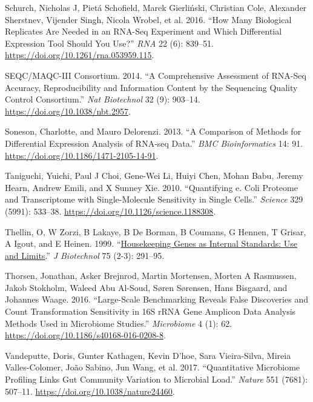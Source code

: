 \documentclass[
]{article}
\newlength{\cslhangindent}
\newlength{\cslentryspacingunit} %
\newenvironment{CSLReferences}[2] %
 {%
  \setlength{\parindent}{0pt}
  \ifodd #1
  \let\oldpar\par
  \def\par{\hangindent=\cslhangindent\oldpar}
  \fi
  \setlength{\parskip}{#2\cslentryspacingunit}
 }%
 {}
\begin{document}
\begin{CSLReferences}{1}{0}
\leavevmode{}%
Schurch, Nicholas J, Pietá Schofield, Marek Gierliński, Christian Cole,
Alexander Sherstnev, Vijender Singh, Nicola Wrobel, et al. 2016. {``How
Many Biological Replicates Are Needed in an RNA-Seq Experiment and Which
Differential Expression Tool Should You Use?''} \emph{RNA} 22 (6):
839--51. \url{https://doi.org/10.1261/rna.053959.115}.

\leavevmode{}%
SEQC/MAQC-III Consortium. 2014. {``A Comprehensive Assessment of RNA-Seq
Accuracy, Reproducibility and Information Content by the Sequencing
Quality Control Consortium.''} \emph{Nat Biotechnol} 32 (9): 903--14.
\url{https://doi.org/10.1038/nbt.2957}.

\leavevmode{}%
Soneson, Charlotte, and Mauro Delorenzi. 2013. {``A Comparison of
Methods for Differential Expression Analysis of {RNA-seq} Data.''}
\emph{BMC Bioinformatics} 14: 91.
\url{https://doi.org/10.1186/1471-2105-14-91}.

\leavevmode{}%
Taniguchi, Yuichi, Paul J Choi, Gene-Wei Li, Huiyi Chen, Mohan Babu,
Jeremy Hearn, Andrew Emili, and X Sunney Xie. 2010. {``Quantifying e.
Coli Proteome and Transcriptome with Single-Molecule Sensitivity in
Single Cells.''} \emph{Science} 329 (5991): 533--38.
\url{https://doi.org/10.1126/science.1188308}.

\leavevmode{}%
Thellin, O, W Zorzi, B Lakaye, B De Borman, B Coumans, G Hennen, T
Grisar, A Igout, and E Heinen. 1999.
{``\href{https://www.ncbi.nlm.nih.gov/pubmed/10617337}{Housekeeping
Genes as Internal Standards: Use and Limits}.''} \emph{J Biotechnol} 75
(2-3): 291--95.

\leavevmode{}%
Thorsen, Jonathan, Asker Brejnrod, Martin Mortensen, Morten A Rasmussen,
Jakob Stokholm, Waleed Abu Al-Soud, Søren Sørensen, Hans Bisgaard, and
Johannes Waage. 2016. {``Large-Scale Benchmarking Reveals False
Discoveries and Count Transformation Sensitivity in 16{S} r{RNA} Gene
Amplicon Data Analysis Methods Used in Microbiome Studies.''}
\emph{Microbiome} 4 (1): 62.
\url{https://doi.org/10.1186/s40168-016-0208-8}.

\leavevmode{}%
Vandeputte, Doris, Gunter Kathagen, Kevin D'hoe, Sara Vieira-Silva,
Mireia Valles-Colomer, João Sabino, Jun Wang, et al. 2017.
{``Quantitative Microbiome Profiling Links Gut Community Variation to
Microbial Load.''} \emph{Nature} 551 (7681): 507--11.
\url{https://doi.org/10.1038/nature24460}.


\end{CSLReferences}
\end{document}
